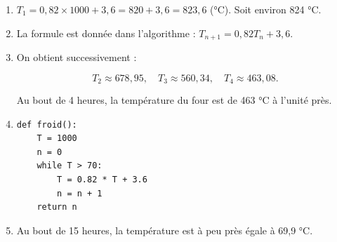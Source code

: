 \begin{enumerate}
	\item  \(T_1 = 0,82 \times 1000 + 3,6 = 820 + 3,6 = 823,6\) (°C). Soit environ 824 °C.
	
\item La formule est donnée dans l'algorithme : \(T_{n+1} = 0,82T_n + 3,6\).
	
	\item On obtient successivement :
	
	\[
	T_2 \approx 678,95, \quad T_3 \approx 560,34, \quad T_4 \approx 463,08.
	\]
	
	Au bout de 4 heures, la température du four est de 463 °C à l'unité près.
	
\item \begin{minipage}{7cm}	\begin{lstlisting}[style=python]
def froid():
	T = 1000
	n = 0
	while T > 70:
		T = 0.82 * T + 3.6
        n = n + 1
    return n
\end{lstlisting} \end{minipage}
		
\item Au bout de 15 heures, la température est à peu près égale à 69,9 °C.
\end{enumerate}
